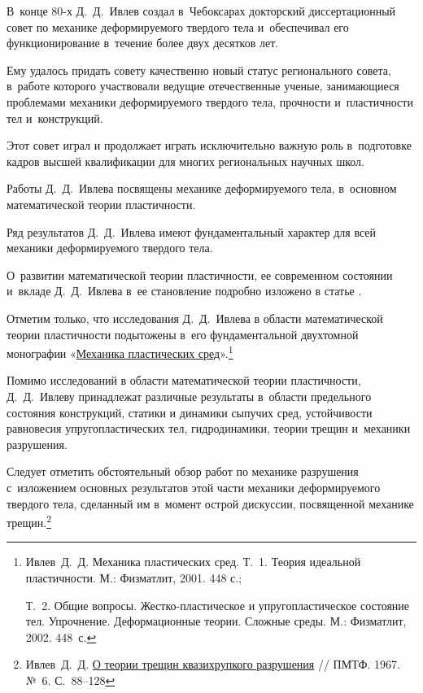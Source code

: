 В~конце 80-х Д.~Д.~Ивлев создал в~Чебоксарах докторский диссертационный совет по механике деформируемого твердого тела и~обеспечивал его функционирование в~течение более двух десятков лет. 

Ему удалось придать совету качественно новый статус регионального совета, в~работе которого участвовали ведущие отечественные ученые, занимающиеся проблемами механики деформируемого твердого тела, прочности и~пластичности тел и~конструкций.

Этот совет играл и продолжает играть исключительно важную роль в~подготовке кадров высшей квалификации для многих региональных научных школ.



Работы Д.~Д.~Ивлева посвящены механике деформируемого тела, в~основном математической теории пластичности. 

Ряд результатов Д.~Д.~Ивлева имеют фундаментальный характер для всей механики деформируемого твердого тела. 

О~развитии математической теории пластичности, ее современном состоянии и~вкладе Д.~Д.~Ивлева в~ее становление  подробно изложено в статье \cite{publ:9}. 

Отметим только, что исследования Д.~Д.~Ивлева в области математической теории пластичности подытожены в~его фундаментальной двухтомной монографии «\href{https://scholar.google.com/scholar?cluster=15515091141853988882}{Механика пластических сред}».\footnote{Ивлев~Д.~Д. Механика пластических сред. Т.~1. Теория идеальной пластичности. М.: Физматлит, 2001. 448 с.;

Т.~2. Общие вопросы. Жестко-пластическое и упругопластическое состояние тел. Упрочнение. Деформационные теории. Сложные среды. М.: Физматлит, 2002. 448~с.}



Помимо исследований в области математической теории пластичности, Д.~Д.~Ивлеву принадлежат различные результаты в~области предельного состояния конструкций, статики и динамики сыпучих сред, устойчивости равновесия упругопластических тел, гидродинамики, теории трещин и~механики разрушения. 

Следует отметить обстоятельный обзор работ по механике разрушения с~изложением основных результатов этой части механики деформируемого твердого тела, сделанный им в~момент острой дискуссии, посвященной механике трещин.\footnote{Ивлев~Д.~Д. \href{http://www.sibran.ru/journals/issue.php?ID=158788&ARTICLE_ID=158977}{О теории трещин квазихрупкого разрушения} // ПМТФ. 1967. №~6. С.~88–128} 



